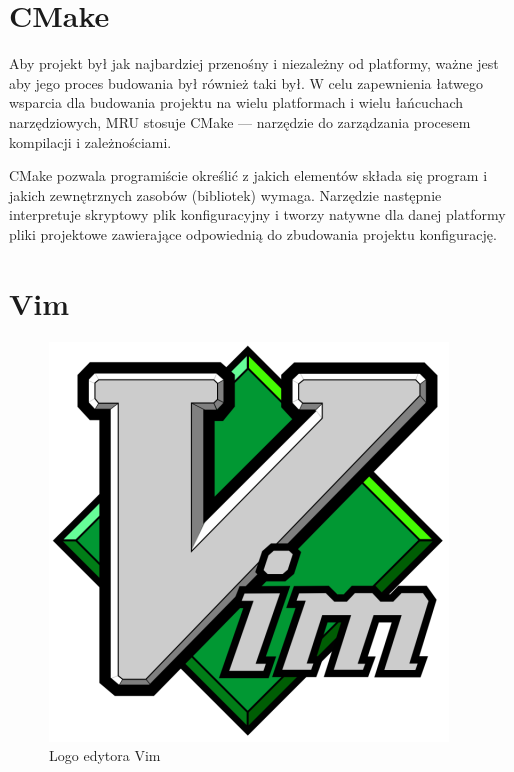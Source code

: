 \section{CMake}

\par
Aby projekt był jak najbardziej przenośny i niezależny od platformy, ważne jest aby jego proces budowania był również taki był.
W celu zapewnienia łatwego wsparcia dla budowania projektu na wielu platformach i wielu łańcuchach narzędziowych, MRU stosuje CMake --- narzędzie do zarządzania procesem kompilacji i zależnościami.
\par
CMake pozwala programiście określić z jakich elementów składa się program i jakich zewnętrznych zasobów (bibliotek) wymaga. Narzędzie następnie interpretuje skryptowy plik konfiguracyjny i tworzy natywne dla danej platformy pliki projektowe zawierające odpowiednią do zbudowania projektu konfigurację.

\section{Vim}
\begin{figure}
\begin{center}
\includegraphics[scale=0.3]{img/vim_logo.png}
\end{center}
\caption{Logo edytora Vim}
\end{figure}

